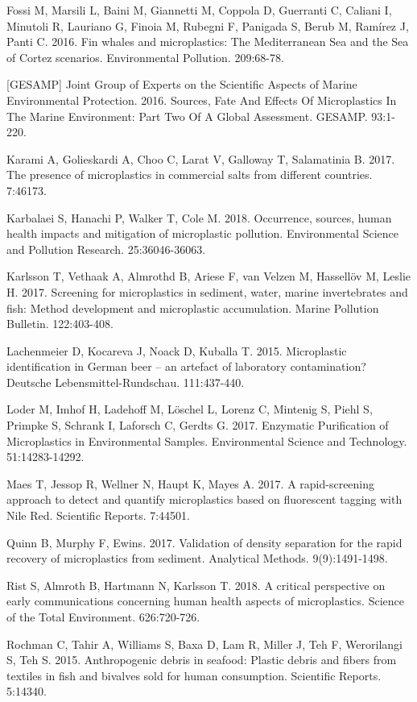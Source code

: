 \documentclass[]{article}
\begin{document}
Fossi M, Marsili L, Baini M, Giannetti M, Coppola D, Guerranti C,
Caliani I, Minutoli R, Lauriano G, Finoia M, Rubegni F, Panigada S,
Berub M, Ramírez J, Panti C. 2016. Fin whales and microplastics: The
Mediterranean Sea and the Sea of Cortez scenarios. Environmental
Pollution. 209:68-78.~

{[}GESAMP{]} Joint Group of Experts on the Scientific Aspects of Marine
Environmental Protection. 2016. Sources, Fate And Effects Of
Microplastics In The Marine Environment: Part Two Of A Global
Assessment. GESAMP. 93:1-220.~

Karami A, Golieskardi A, Choo C, Larat V, Galloway T, Salamatinia B.
2017. The presence of microplastics in commercial salts from different
countries. 7:46173.~

Karbalaei S, Hanachi P, Walker T, Cole M. 2018. Occurrence, sources,
human health impacts and mitigation of microplastic pollution.
Environmental Science and Pollution Research. 25:36046-36063.~

Karlsson T, Vethaak A, Almrothd B, Ariese F, van Velzen M, Hassellöv M,
Leslie H. 2017. Screening for microplastics in sediment, water, marine
invertebrates and fish: Method development and microplastic
accumulation. Marine Pollution Bulletin. 122:403-408.~

Lachenmeier D, Kocareva J, Noack D, Kuballa T. 2015. Microplastic
identification in German beer -- an artefact of laboratory
contamination? Deutsche Lebensmittel-Rundschau. 111:437-440. ~

Loder M, Imhof H, Ladehoff M, Löschel L, Lorenz C, Mintenig S, Piehl S,
Primpke S, Schrank I, Laforsch C, Gerdts G. 2017. Enzymatic Purification
of Microplastics in Environmental Samples. Environmental Science and
Technology. 51:14283-14292.~

Maes T, Jessop R, Wellner N, Haupt K, Mayes A. 2017. A rapid-screening
approach to detect and quantify microplastics based on fluorescent
tagging with Nile Red. Scientific Reports. 7:44501.~

Quinn B, Murphy F, Ewins. 2017. Validation of density separation for the
rapid recovery of microplastics from sediment. Analytical Methods.
9(9):1491-1498.~

Rist S, Almroth B, Hartmann N, Karlsson T. 2018. A critical perspective
on early communications concerning human health aspects of
microplastics. Science of the Total Environment. 626:720-726.~

Rochman C, Tahir A, Williams S, Baxa D, Lam R, Miller J, Teh F,
Werorilangi S, Teh S. 2015. Anthropogenic debris in seafood: Plastic
debris and fibers from textiles in fish and bivalves sold for human
consumption. Scientific Reports. 5:14340.~
\end{document}
